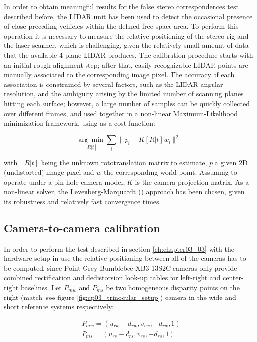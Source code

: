 In order to obtain meaningful results for the false stereo correspondences test described before, the LIDAR unit has been used to detect the occasional presence of close preceding vehicles within the defined free space area. To perform this operation it is necessary to measure the relative positioning of the stereo rig and the laser-scanner, which is challenging, given the relatively small amount of data that the available 4-plane LIDAR produces.
The calibration procedure starts with an initial rough alignment step; after that, easily recognizable LIDAR points are manually associated to the corresponding image pixel. The accuracy of each association is constrained by several factors, such as the LIDAR angular resolution, and the ambiguity arising by the limited number of scanning planes hitting each surface; however, a large number of samples can be quickly collected over different frames, and used together in a non-linear Maximum-Likelihood minimization framework, using as a cost function:

\begin{equation}\label{eq:cp03_ML}
\underset{[R|t]}{\arg\min} \sum_{i} \lVert p_i - K[R|t] w_i \rVert^2
\end{equation}

with $[R|t]$ being the unknown rototranslation matrix to estimate, $p$ a given 2D (undistorted) image pixel and $w$ the corresponding world point. Assuming to operate under a pin-hole camera model, $K$ is the camera projection matrix. As a non-linear solver, the Levenberg-Marquardt (\cite{Levenberg1944}) approach has been chosen, given its robustness and relatively fast convergence times.

\subsection{Camera-to-camera calibration}\label{ch:chapter03_02_02}

In order to perform the test described in section \ref{ch:chapter03_03} with the hardware setup in use the relative positioning between all of the cameras has to be computed, since Point Grey Bumblebee\textregistered{} XB3-13S2C cameras only provide combined rectification and dedistorsion look-up tables for left-right and center-right baselines.
Let $P_{mw}$ and $P_{ms}$ be two homogeneous disparity points on the right (match, see figure \ref{fig:cp03_trinocular_setup}) camera in the wide and short reference systems respectively:

\begin{align}\label{eq:cp03_dispPoints}
& P_{mw} = (u_{rw} - d_{rw}, v_{rw}, -d_{rw}, 1) \nonumber \\
& P_{ms} = (u_{rs} - d_{rs}, v_{rs}, -d_{rs}, 1)
\end{align}

